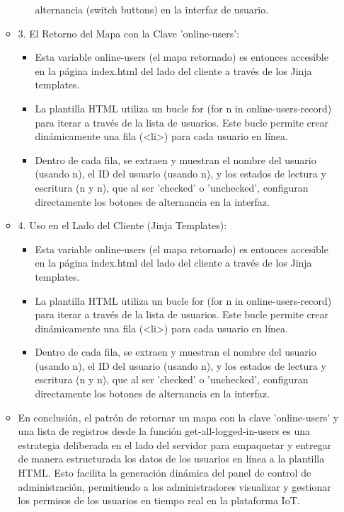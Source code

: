 \documentclass{report}
\begin{document}
\begin{itemize}
\begin{itemize}
\begin{itemize}
                    alternancia (switch buttons) en la interfaz de usuario.            
                \end{itemize}
            \item 3. El Retorno del Mapa con la Clave 'online-users':
                \begin{itemize}
                    \item Esta variable online-users (el mapa retornado) es entonces accesible en la página index.html del lado del cliente a través de los 
                    Jinja templates.
                    \item La plantilla HTML utiliza un bucle for (for n in online-users-record) para iterar a través de la lista de usuarios. Este bucle 
                    permite crear dinámicamente una fila (<li>) para cada usuario en línea.
                    \item Dentro de cada fila, se extraen y muestran el nombre del usuario (usando n), el ID del usuario (usando n), y los estados de 
                    lectura y escritura (n y n), que al ser 'checked' o 'unchecked', configuran directamente los botones de alternancia en la interfaz.
                \end{itemize}
            \item 4. Uso en el Lado del Cliente (Jinja Templates):
                \begin{itemize}
                     \item Esta variable online-users (el mapa retornado) es entonces accesible en la página index.html del lado del cliente a través de los 
                     Jinja templates.
                    \item La plantilla HTML utiliza un bucle for (for n in online-users-record) para iterar a través de la lista de usuarios. Este bucle 
                    permite crear dinámicamente una fila (<li>) para cada usuario en línea.
                    \item Dentro de cada fila, se extraen y muestran el nombre del usuario (usando n), el ID del usuario (usando n), y los estados de lectura 
                    y escritura (n y n), que al ser 'checked' o 'unchecked', configuran directamente los botones de alternancia en la interfaz.
                \end{itemize}
            \item En conclusión, el patrón de retornar un mapa con la clave 'online-users' y una lista de registros desde la función get-all-logged-in-users 
            es una estrategia deliberada en el lado del servidor para empaquetar y entregar de manera estructurada los datos de los usuarios en línea a la 
            plantilla HTML. Esto facilita la generación dinámica del panel de control de administración, permitiendo a los administradores visualizar y 
            gestionar los permisos de los usuarios en tiempo real en la plataforma IoT.
        \end{itemize}
\end{itemize}
\end{document}

